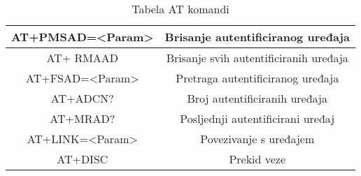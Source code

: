 \documentclass[../Document.tex]{subfiles}
\begin{document}
\begin{table}[h]
\begin{tabular}{ |c|c| }
        AT+PMSAD=<Param>                  & Brisanje autentificiranog uređaja         \\\hline
        AT+ RMAAD                         & Brisanje svih autentificiranih uređaja    \\\hline
        AT+FSAD=<Param>                         & Pretraga autentificiranog  uređaja    \\\hline
        AT+ADCN?                         & Broj autentificiranih uređaja    \\\hline
        AT+MRAD?                         & Posljednji autentificirani uređaj \\\hline
        AT+LINK=<Param>                         & Povezivanje s uređajem \\\hline
        AT+DISC                         & Prekid veze \\\hline
    \end{tabular}
    \caption{Tabela AT komandi}
    \def\arraystretch{1}
\end{table}
\end{document}
